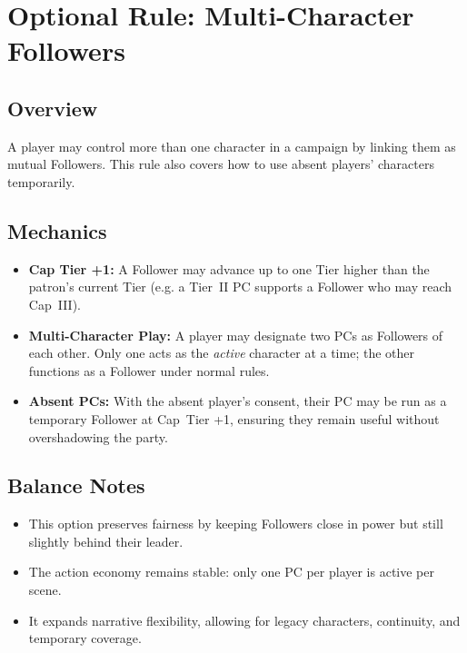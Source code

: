\section{Optional Rule: Multi-Character Followers}
\label{sec:multi-character-followers}

\subsection*{Overview}
A player may control more than one character in a campaign by linking them as mutual Followers. This rule also covers how to use absent players' characters temporarily.

\subsection*{Mechanics}
\begin{itemize}
  \item \textbf{Cap Tier +1:} A Follower may advance up to one Tier higher than the patron’s current Tier (e.g. a Tier~II PC supports a Follower who may reach Cap~III).
  \item \textbf{Multi-Character Play:} A player may designate two PCs as Followers of each other. Only one acts as the \emph{active} character at a time; the other functions as a Follower under normal rules.
  \item \textbf{Absent PCs:} With the absent player’s consent, their PC may be run as a temporary Follower at Cap~Tier +1, ensuring they remain useful without overshadowing the party.
\end{itemize}

\subsection*{Balance Notes}
\begin{itemize}
  \item This option preserves fairness by keeping Followers close in power but still slightly behind their leader.
  \item The action economy remains stable: only one PC per player is active per scene.
  \item It expands narrative flexibility, allowing for legacy characters, continuity, and temporary coverage.
\end{itemize}